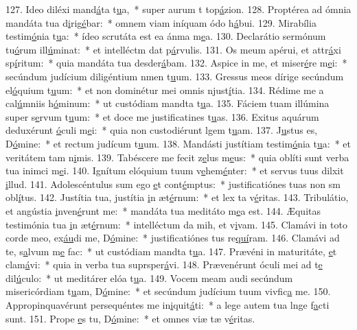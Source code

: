 127. Ideo diléxi mand\uline{á}ta t\uline{u}a,~* super aurum t top\uline{á}zion.
128. Proptérea ad ómnia mandáta tua d\uline{i}rig\uline{é}bar:~* omnem viam iníquam ódo h\uline{á}bui.
129. Mirabília testim\uline{ó}nia t\uline{u}a:~* ídeo scrutáta est ea ánma m\uline{e}a.
130. Declarátio sermónum tu\uline{ó}rum ill\uline{ú}minat:~* et intelléctm dat p\uline{á}rvulis.
131. Os meum apérui, et attr\uline{á}xi sp\uline{í}ritum:~* quia mandáta tua desder\uline{á}bam.
132. Aspice in me, et miser\uline{é}re m\uline{e}i:~* secúndum judícium diligéntium nmen t\uline{u}um.
133. Gressus meos dírige secúndum el\uline{ó}quium t\uline{u}um:~* et non dominétur mei omnis njust\uline{í}tia.
134. Rédime me a cal\uline{ú}mniis h\uline{ó}minum:~* ut custódiam mandta t\uline{u}a.
135. Fáciem tuam illúmina super s\uline{e}rvum t\uline{u}um:~* et doce me justificatines t\uline{u}as.
136. Exitus aquárum deduxérunt \uline{ó}culi m\uline{e}i:~* quia non custodiérunt lgem t\uline{u}am.
137. J\uline{u}stus es, D\uline{ó}mine:~* et rectum judícum t\uline{u}um.
138. Mandásti justítiam testim\uline{ó}nia t\uline{u}a:~* et veritátem tam n\uline{i}mis.
139. Tabéscere me fecit z\uline{e}lus m\uline{e}us:~* quia oblíti sunt verba tua inimci m\uline{e}i.
140. Ignítum elóquium tuum v\uline{e}hem\uline{é}nter:~* et servus tuus dilxit \uline{i}llud.
141. Adolescéntulus sum ego \uline{e}t cont\uline{é}mptus:~* justificatiónes tuas non sm obl\uline{í}tus.
142. Justítia tua, justítia \uline{i}n æt\uline{é}rnum:~* et lex ta v\uline{é}ritas.
143. Tribulátio, et angústia \uline{i}nven\uline{é}runt me:~* mandáta tua meditáto m\uline{e}a est.
144. Æquitas testimónia tua \uline{i}n æt\uline{é}rnum:~* intelléctum da mih, et v\uline{i}vam.
145. Clamávi in toto corde meo, ex\uline{áu}di me, D\uline{ó}mine:~* justificatiónes tus re\uline{quí}ram.
146. Clamávi ad te, s\uline{a}lvum m\uline{e} fac:~* ut custódiam mandta t\uline{u}a.
147. Prævéni in maturitáte, \uline{e}t clam\uline{á}vi:~* quia in verba tua suprsper\uline{á}vi.
148. Prævenérunt óculi mei ad t\uline{e} dil\uline{ú}culo:~* ut meditárer elóa t\uline{u}a.
149. Vocem meam audi secúndum misericórdiam t\uline{u}am, D\uline{ó}mine:~* et secúndum judícium tuum vivfic\uline{a} me.
150. Appropinquavérunt persequéntes me in\uline{i}quit\uline{á}ti:~* a lege autem tua lnge f\uline{a}cti sunt.
151. Prope \uline{e}s tu, D\uline{ó}mine:~* et omnes viæ tæ v\uline{é}ritas.
